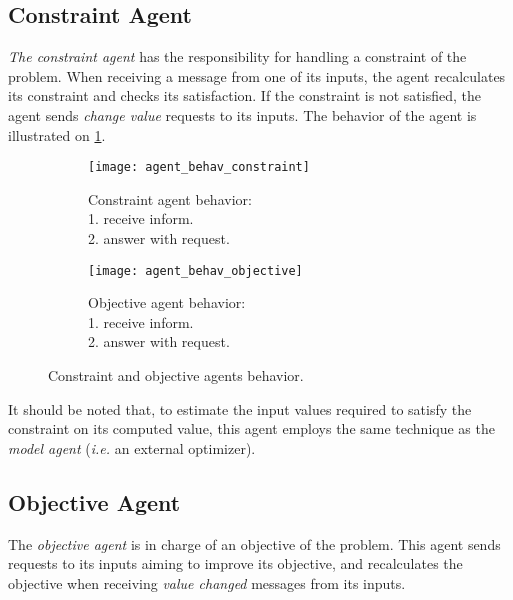 
\subsection{Constraint Agent}
 \emph{The constraint agent} has the responsibility for handling a constraint of the problem. When receiving a message from one of its inputs, the agent recalculates its constraint and checks its satisfaction. If the constraint is not satisfied, the agent sends \emph{change value} requests to its inputs. The behavior of the agent is illustrated on \figurename{} \ref{agent_behav_constraint}.
 
\begin{figure}
\centering
\begin{subfigure}{0.3\textwidth}
	\texttt{[image: agent\_behav\_constraint]}
	\caption{Constraint agent behavior:\\1. receive inform.\\2. answer with request.}\label{agent_behav_constraint}
\end{subfigure}
\qquad
\begin{subfigure}{0.3\textwidth}
	\texttt{[image: agent\_behav\_objective]}
	\caption{Objective agent behavior:\\1. receive inform.\\2. answer with request.}\label{agent_behav_objective}
\end{subfigure}
\caption{Constraint and objective agents behavior.}\label{agent_behav_constraint_and_objective}
\end{figure}

It should be noted that, to estimate the input values required to satisfy the constraint on its computed value, this agent employs the same technique as the \emph{model agent} (\textit{i.e.} an external optimizer).

\subsection{Objective Agent}
The \emph{objective agent} is in charge of an objective of the problem. This agent sends requests to its inputs aiming to improve its objective, and recalculates the objective when receiving \emph{value changed} messages from its inputs.

